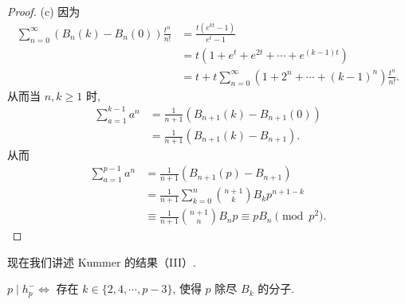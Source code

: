 \begin{proof}
(c) 因为
\begin{align*}
  \sum_{n=0}^{\infty}(B_n(k)-B_n(0))\frac{t^n}{n!}&=\frac{t(e^{kt}-1)}{e^t-1}\\
  &=t(1+e^t+e^{2t}+\cdots+e^{(k-1)t})\\
  &=t+t\sum_{n=0}^{\infty}(1+2^n+\cdots+(k-1)^n)\frac{t^n}{n!}.
\end{align*}
从而当 $n,k\geqslant 1$ 时,
\begin{align*}
  \sum_{a=1}^{k-1}a^n&=\frac{1}{n+1}(B_{n+1}(k)-B_{n+1}(0))\\
  &=\frac{1}{n+1}(B_{n+1}(k)-B_{n+1}).
\end{align*}
从而
\begin{align*}
  \sum_{a=1}^{p-1}a^n&=\frac{1}{n+1}(B_{n+1}(p)-B_{n+1})\\
  &=\frac{1}{n+1}\sum_{k=0}^{n}\binom{n+1}{k}B_kp^{n+1-k}\\
  &\equiv\frac{1}{n+1}\binom{n+1}{n}B_np\equiv pB_n\pmod{p^2}.
\end{align*}
\end{proof}

现在我们讲述 Kummer 的结果（III）.

\begin{theorem}\label{thm:6.6}
$p\mid h_p^-\Leftrightarrow$ 存在 $k\in\{2,4,\cdots,p-3\}$, 使得 $p$ 除尽 $B_k$ 的分子.
\end{theorem}

